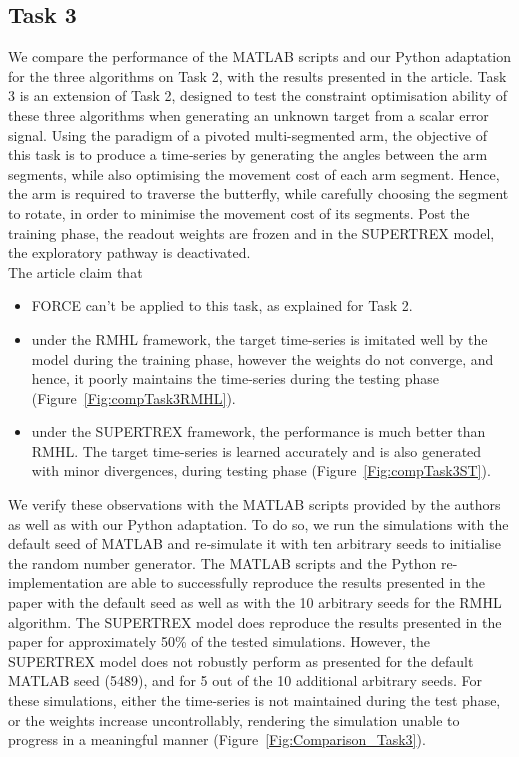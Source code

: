 \subsection{Task 3}
We compare the performance of the MATLAB scripts and our Python adaptation for the three algorithms  on Task 2, with the results presented in the article. Task 3 is an extension of Task 2, designed to test the constraint optimisation ability of these three algorithms when generating an unknown target from a scalar error signal. Using the paradigm of a pivoted multi-segmented arm, the objective of this task is to produce a time‐series by generating the angles between the arm segments, while also optimising the movement cost of each arm segment. Hence, the arm is required to traverse the butterfly, while carefully choosing the segment to rotate, in order to minimise the movement cost of its segments. Post the training phase, the readout weights are frozen and in the SUPERTREX model, the exploratory pathway is deactivated. \\

The article claim that
\begin{itemize}
    \item FORCE can't be applied to this task, as explained for Task 2.
    \item under the RMHL framework, the target time-series is imitated well by the model during the training phase, however the weights do not converge, and hence, it poorly maintains the time-series during the testing phase (Figure~\ref{Fig:compTask3RMHL}).
    \item under the SUPERTREX framework, the performance is much better than RMHL. The target time-series is learned accurately and is also generated with minor divergences, during testing phase (Figure~\ref{Fig:compTask3ST}).
\end{itemize}

We verify these observations with the MATLAB scripts provided by the authors as well as with our Python adaptation. To do so, we run the simulations with the default seed of MATLAB and re‐simulate it with ten arbitrary seeds to initialise the random number generator. The MATLAB scripts and the Python re-implementation are able to successfully reproduce the results presented in the paper with the default seed as well as with the 10 arbitrary seeds for the RMHL algorithm. The SUPERTREX model does reproduce the results presented in the paper for approximately 50\% of the tested simulations. However, the SUPERTREX model does not robustly perform as presented for the default MATLAB seed (5489), and for 5 out of the 10 additional arbitrary seeds. For these simulations, either the time-series is not maintained during the test phase, or the weights increase uncontrollably, rendering the simulation unable to progress in a meaningful manner (Figure~\ref{Fig:Comparison_Task3}).



